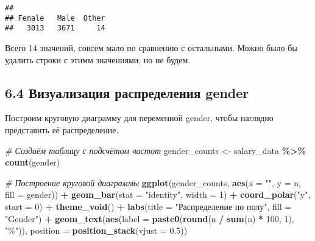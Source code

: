 \documentclass[
]{article}
\newenvironment{Shaded}{\begin{snugshade}}{\end{snugshade}}
\newcommand{\AttributeTok}[1]{\textcolor[rgb]{0.13,0.29,0.53}{#1}}
\newcommand{\CommentTok}[1]{\textcolor[rgb]{0.56,0.35,0.01}{\textit{#1}}}
\newcommand{\DecValTok}[1]{\textcolor[rgb]{0.00,0.00,0.81}{#1}}
\newcommand{\FloatTok}[1]{\textcolor[rgb]{0.00,0.00,0.81}{#1}}
\newcommand{\FunctionTok}[1]{\textcolor[rgb]{0.13,0.29,0.53}{\textbf{#1}}}
\newcommand{\NormalTok}[1]{#1}
\newcommand{\OtherTok}[1]{\textcolor[rgb]{0.56,0.35,0.01}{#1}}
\newcommand{\SpecialCharTok}[1]{\textcolor[rgb]{0.81,0.36,0.00}{\textbf{#1}}}
\newcommand{\StringTok}[1]{\textcolor[rgb]{0.31,0.60,0.02}{#1}}
\begin{document}
\begin{verbatim}
## 
## Female   Male  Other 
##   3013   3671     14
\end{verbatim}

Всего 14 значений, совсем мало по сравнению с остальными. Можно было бы
удалить строки с этимм значениями, но не будем.

\subsection{6.4 Визуализация распределения
gender}\label{ux432ux438ux437ux443ux430ux43bux438ux437ux430ux446ux438ux44f-ux440ux430ux441ux43fux440ux435ux434ux435ux43bux435ux43dux438ux44f-gender}

Построим круговую диаграмму для переменной gender, чтобы наглядно
представить её распределение.

\begin{Shaded}
\begin{Highlighting}[]
\CommentTok{\# Создаём таблицу с подсчётом частот}
\NormalTok{gender\_counts }\OtherTok{\textless{}{-}}\NormalTok{ salary\_data }\SpecialCharTok{\%\textgreater{}\%}
  \FunctionTok{count}\NormalTok{(gender)}

\CommentTok{\# Построение круговой диаграммы}
\FunctionTok{ggplot}\NormalTok{(gender\_counts, }\FunctionTok{aes}\NormalTok{(}\AttributeTok{x =} \StringTok{""}\NormalTok{, }\AttributeTok{y =}\NormalTok{ n, }\AttributeTok{fill =}\NormalTok{ gender)) }\SpecialCharTok{+}
  \FunctionTok{geom\_bar}\NormalTok{(}\AttributeTok{stat =} \StringTok{"identity"}\NormalTok{, }\AttributeTok{width =} \DecValTok{1}\NormalTok{) }\SpecialCharTok{+}
  \FunctionTok{coord\_polar}\NormalTok{(}\StringTok{"y"}\NormalTok{, }\AttributeTok{start =} \DecValTok{0}\NormalTok{) }\SpecialCharTok{+}
  \FunctionTok{theme\_void}\NormalTok{() }\SpecialCharTok{+}
  \FunctionTok{labs}\NormalTok{(}\AttributeTok{title =} \StringTok{"Распределение по полу"}\NormalTok{, }\AttributeTok{fill =} \StringTok{"Gender"}\NormalTok{) }\SpecialCharTok{+}
  \FunctionTok{geom\_text}\NormalTok{(}\FunctionTok{aes}\NormalTok{(}\AttributeTok{label =} \FunctionTok{paste0}\NormalTok{(}\FunctionTok{round}\NormalTok{(n }\SpecialCharTok{/} \FunctionTok{sum}\NormalTok{(n) }\SpecialCharTok{*} \DecValTok{100}\NormalTok{, }\DecValTok{1}\NormalTok{), }\StringTok{"\%"}\NormalTok{)), }
            \AttributeTok{position =} \FunctionTok{position\_stack}\NormalTok{(}\AttributeTok{vjust =} \FloatTok{0.5}\NormalTok{))}
\end{Highlighting}
\end{Shaded}
\end{document}
